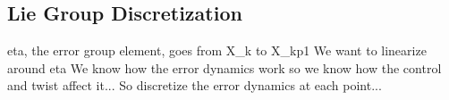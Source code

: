 \documentclass[../main.tex]{subfiles}
\begin{document}
\subsection{Lie Group Discretization}
eta, the error group element, goes from X_k to X_kp1 
We want to linearize around eta
We know how the error dynamics work so we know how the control and twist affect it...
So discretize the error dynamics at each point...
\end{document}
